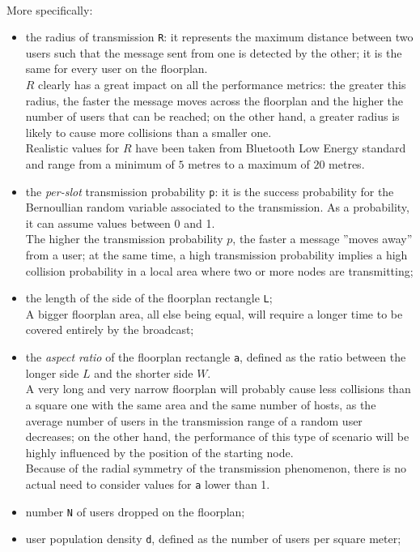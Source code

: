 \\
More specifically:
\begin{itemize}
	\item the radius of transmission \colorbox{gray!30}{\large \texttt{R}}: it
	represents the maximum distance between two users such that the message
	sent from one is detected by the other; it is the same for every user on
	the floorplan.\\
	$R$ clearly has a great impact on all
    the performance metrics: the greater this radius, the faster the message
    moves across the floorplan and the higher the number of users that can be
    reached; on the other hand, a greater radius is likely to cause more
    collisions than a smaller one. \\
	 Realistic values for $R$ have been taken from Bluetooth Low
	Energy standard and range from a minimum of $5$ metres to a maximum of $20$
	metres.
	\item the \textit{per-slot} transmission probability
	\colorbox{gray!30}{\large \texttt{p}}: it is the success probability for the
	Bernoullian random variable associated to the transmission. As a
	probability, it can assume values between 0 and 1.\\
	The higher the transmission probability $p$, the faster a message ”moves away” from
a user; at the same time, a high transmission probability implies a high collision
probability in a local area where two or more nodes are transmitting;
    \item the length of the side of the floorplan rectangle
    \colorbox{gray!30}{\large \texttt{L}}; \\
    A bigger floorplan area, all else being equal, will require a longer
    time to be covered entirely by the broadcast;
	\item the \textit{aspect ratio} of the floorplan rectangle
	\colorbox{gray!30}{\large \texttt{a}}, defined as the ratio between the
	longer side $L$ and the shorter side $W$.\\
	A very long and very narrow floorplan will probably cause less collisions than a
square one with the same area and the same number of hosts, as the average number of users in the transmission
range of a random user decreases; on the other hand, the performance of this type of
scenario will be highly influenced by the position of the starting node.\\
	Because of the radial symmetry of
	the transmission phenomenon, there is no actual need to consider values for
	\texttt{a} lower than 1.
	\item number \colorbox{gray!30}{\large \texttt{N}} of users dropped on the floorplan;
	\item user population density \colorbox{gray!30}{\large \texttt{d}},
	defined as the number of users per square meter;
\end{itemize}
